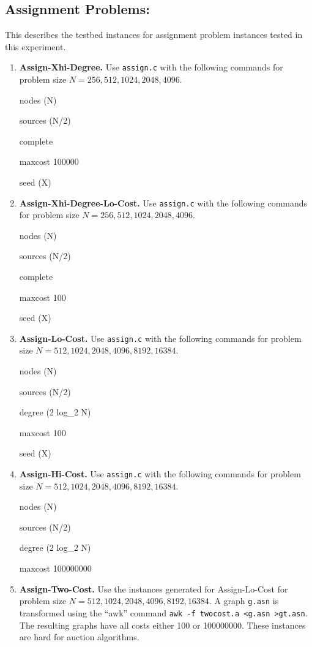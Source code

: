 \subsection{Assignment Problems:}

This describes the testbed instances for assignment problem
instances tested in this experiment.

\begin{enumerate} 
\item {\bf Assign-Xhi-Degree.}  Use {\tt assign.c} with the following
commands for problem size $N=256, 512, 1024, 2048, 4096$. 

nodes (N)

sources (N/2)

complete

maxcost 100000

seed (X)

\item {\bf Assign-Xhi-Degree-Lo-Cost.}  Use {\tt assign.c} with the following
commands for problem size $N=256, 512, 1024, 2048, 4096$. 

nodes (N)

sources (N/2)

complete

maxcost 100

seed (X)


\item {\bf Assign-Lo-Cost.}  Use {\tt assign.c} with the following
commands for problem size $N=512, 1024, 2048, 4096, 8192, 16384$. 

nodes (N)

sources (N/2)

degree  (2 log\_2 N)

maxcost 100

seed (X)

\item {\bf Assign-Hi-Cost.}  Use {\tt assign.c} with the following
commands  for problem size $N=512, 1024, 2048, 4096, 8192, 16384$. 

nodes (N)

sources (N/2)

degree (2 log\_2 N)

maxcost 100000000

\item {\bf Assign-Two-Cost.}  Use the instances generated for 
Assign-Lo-Cost for problem size $N=512, 1024, 2048, 4096, 8192, 16384$. 
A graph {\tt g.asn} is transformed using the
``awk'' command {\tt awk -f twocost.a <g.asn >gt.asn}.  The resulting graphs
have all costs either 100 or 100000000.  These instances are hard
for auction algorithms. 


\end{enumerate}
